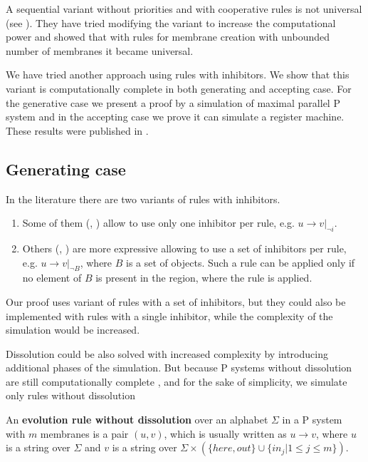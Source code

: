  A sequential variant without priorities and with cooperative rules is not universal (see \cite{Ibarra04dang}). They have tried modifying the variant to increase the computational power and showed that with rules for membrane creation with unbounded number of membranes it became universal.

We have tried another approach using rules with inhibitors. We show that this variant is computationally complete in both generating and accepting case. For the generative case we present a proof by a simulation of maximal parallel P system and in the accepting case we prove it can simulate a register machine. These results were published in \cite{Kovac14Inhibitors}.

\subsection{Generating case} %
\label{sub:generating_case}

In the literature there are two variants of  rules with inhibitors.
\begin{enumerate}
  \item Some of them (\cite{Ionescu:jucs_10_5:on_p_systems_with}, \cite{Sburlan05dragos}) allow to use only one inhibitor per rule, e.g. $u\rightarrow v|_{\neg i}$.
  \item Others (\cite{Agrigoroaiei:2010:Dissolution}, \cite{Sburlan:2006:FurtherResultsPromotersInhibitors}) are more expressive allowing to use a set of inhibitors per rule, e.g. $u\rightarrow v|_{\neg B}$, where $B$ is a set of objects. Such a rule can be applied only if no element of $B$ is present in the region, where the rule is applied.
\end{enumerate}

Our proof uses variant of rules with a set of inhibitors, but they could also be implemented with rules with a single inhibitor, while the complexity of the simulation would be increased.

Dissolution could be also solved with increased complexity by introducing additional phases of the simulation. But because P systems without dissolution are still computationally complete \cite{Agrigoroaiei:2010:Dissolution}, and for the sake of simplicity, we simulate only rules without dissolution 

\begin{definition}
\label{def:evolution_rule_without_dissolution}
  An {\bf evolution rule without dissolution} over an alphabet $\Sigma$ in a P system with $m$ membranes is a pair $(u,v)$, which is usually written as $u\rightarrow v$, where $u$ is a string over $\Sigma$ and $v$ is a string over $\Sigma\times(\{here, out\}\cup\{in_j|1\leq j\leq m\})$.
\end{definition}

